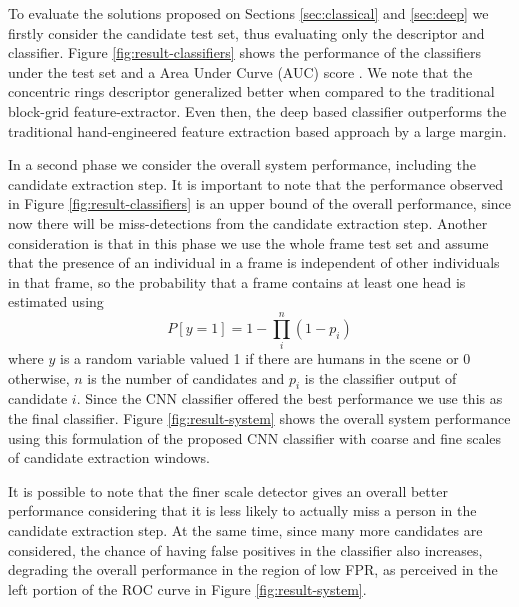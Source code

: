     To evaluate the solutions proposed on Sections \ref{sec:classical} and \ref{sec:deep} we firstly consider the candidate test set, thus evaluating only the descriptor and classifier. Figure \ref{fig:result-classifiers} shows the performance of the classifiers under the test set and a Area Under Curve (AUC) score \cite{evaluationMetrics}. We note that the concentric rings descriptor generalized better when compared to the traditional block-grid feature-extractor. Even then, the deep based classifier outperforms the traditional hand-engineered feature extraction based approach by a large margin.


    \begin{figure*}[!t]
    \centering
    \label{fig:result-classifiers-all}
    \hfil
    \caption{Classifiers performance. The AUC score for each classifier was, respectively, 0.9785, 0.7019 and 0.8745.}
    \label{fig:result-classifiers}
    \end{figure*}


    In a second phase we consider the overall system performance, including the candidate extraction step. It is important to note that the performance observed in Figure \ref{fig:result-classifiers} is an upper bound of the overall performance, since now there will be miss-detections from the candidate extraction step. Another consideration is that in this phase we use the whole frame test set and assume that the presence of an individual in a frame is independent of other individuals in that frame, so the probability that a frame contains at least one head is estimated using
    \begin{equation}
    P[y=1] = 1 - \prod_i^n (1-p_i)
    \end{equation}
    where $y$ is a random variable valued 1 if there are humans in the scene or 0 otherwise, $n$ is the number of candidates and $p_i$ is the classifier output of candidate $i$. Since the CNN classifier offered the best performance we use this as the final classifier. Figure \ref{fig:result-system} shows the overall system performance using this formulation of the proposed CNN classifier with coarse and fine scales of candidate extraction windows.

    It is possible to note that the finer scale detector gives an overall better performance considering that it is less likely to actually miss a person in the candidate extraction step. At the same time, since many more candidates are considered, the chance of having false positives in the classifier also increases, degrading the overall performance in the region of low FPR, as perceived in the left portion of the ROC curve in Figure \ref{fig:result-system}.


